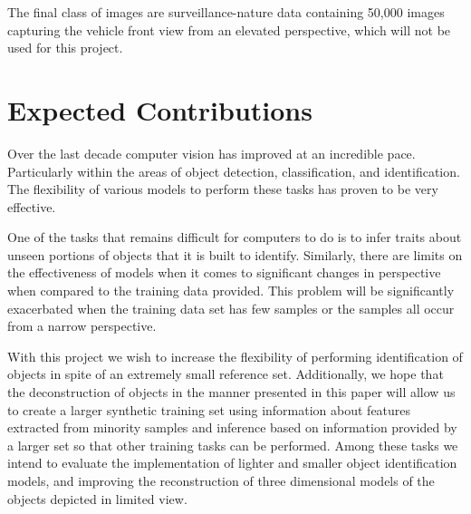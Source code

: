 \documentclass[sigplan,nonacm]{acmart}
\begin{document}
The final class of images are surveillance-nature data containing 50,000 images capturing
the vehicle front view from an elevated perspective, which will not be used for this project.

\section{Expected Contributions}

Over the last decade computer vision has improved at an incredible pace.
Particularly within the areas of object detection, classification, and identification.
The flexibility of various models to perform these tasks has proven to be very effective.

One of the tasks that remains difficult for computers to do is to infer traits about unseen portions
of objects that it is built to identify.
Similarly, there are limits on the effectiveness of models when it comes to significant
changes in perspective when compared to the training data provided.
This problem will be significantly exacerbated when the training data set has few samples
or the samples all occur from a narrow perspective.

With this project we wish to increase the flexibility of performing identification of objects in spite
of an extremely small reference set.
Additionally, we hope that the deconstruction of objects in the manner presented in this paper will allow
us to create a larger synthetic training set using information about features extracted from minority
samples and inference based on information provided by a larger set so that other training tasks can be performed.
Among these tasks we intend to evaluate the implementation of lighter and smaller object identification models, 
and improving the reconstruction of three dimensional models of the objects depicted in limited view. 



\end{document}
